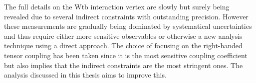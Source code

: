 The full details on the Wtb interaction vertex are slowly but surely being revealed due to several indirect constraints with outstanding precision. However these measurements are gradually being dominated by systematical uncertainties and thus require either more sensitive observables or otherwise a new analysis technique using a direct approach. 
The choice of focusing on the right-handed tensor coupling has been taken since it is the most sensitive coupling coefficient but also implies that the indirect constraints are the most stringent ones.
The analysis discussed in this thesis aims to improve this.


